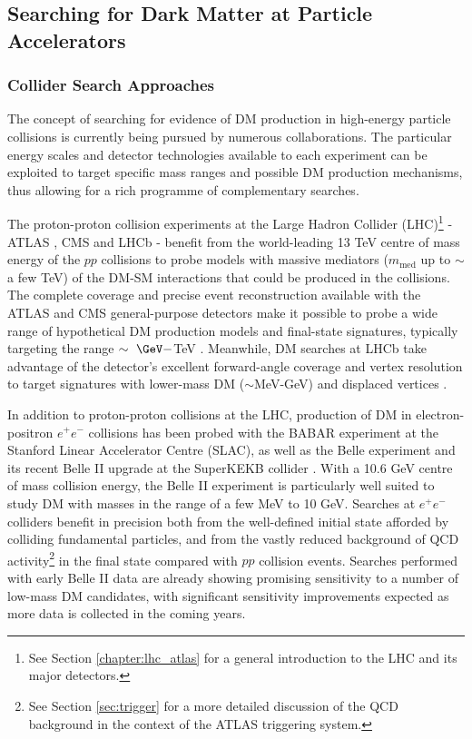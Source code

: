 \subsection{Searching for Dark Matter at Particle Accelerators}

\subsubsection{Collider Search Approaches}

The concept of searching for evidence of DM production in high-energy particle collisions is currently being pursued by numerous collaborations. The particular energy scales and detector technologies available to each experiment can be exploited to target specific mass ranges and possible DM production mechanisms, thus allowing for a rich programme of complementary searches.

The proton-proton collision experiments at the Large Hadron Collider (LHC)\footnote{See Section \ref{chapter:lhc_atlas} for a general introduction to the LHC and its major detectors.} \cite{lhc_machine} - ATLAS \cite{atlas}, CMS \cite{cms} and LHCb \cite{LHCb} - benefit from the world-leading 13 TeV centre of mass energy of the \(pp\) collisions to probe models with massive mediators (\(m_\text{med}\) up to \(\sim\)a few TeV) of the DM-SM interactions that could be produced in the collisions. The complete coverage and precise event reconstruction available with the ATLAS and CMS general-purpose detectors make it possible to probe a wide range of hypothetical DM production models and final-state signatures, typically targeting the range \(\sim~\GeV-\)TeV \cite{Trevisani:2018psx}. Meanwhile, DM searches at LHCb take advantage of the detector's excellent forward-angle coverage and vertex resolution to target signatures with lower-mass DM (\(\sim\)MeV-GeV) and displaced vertices \cite{mombacher2021dark}.

In addition to proton-proton collisions at the LHC, production of DM in electron-positron \(e^+e^-\) collisions has been probed with the BABAR experiment \cite{babar_2002,babar_dm_2020} at the Stanford Linear Accelerator Centre (SLAC), as well as the Belle experiment \cite{belle_detector_2002} and its recent Belle II upgrade \cite{Robertson_2019} at the SuperKEKB collider \cite{superkekb_2018}. With a 10.6 GeV centre of mass collision energy, the Belle II experiment is particularly well suited to study DM with masses in the range of a few MeV to 10 GeV. Searches at \(e^+e^-\) colliders benefit in precision both from the well-defined initial state afforded by colliding fundamental particles, and from the vastly reduced background of QCD activity\footnote{See Section \ref{sec:trigger} for a more detailed discussion of the QCD background in the context of the ATLAS triggering system.} in the final state compared with \(pp\) collision events. Searches performed with early Belle II data \cite{Campajola_2021} are already showing promising sensitivity to a number of low-mass DM candidates, with significant sensitivity improvements expected as more data is collected in the coming years.

